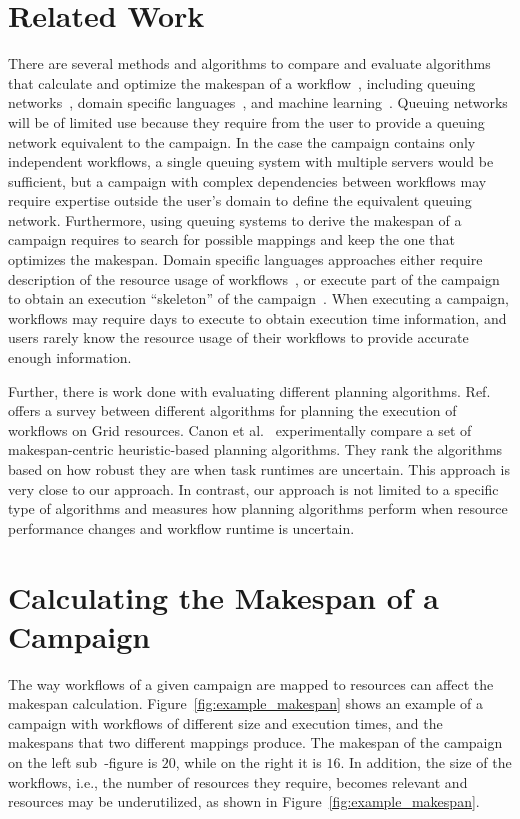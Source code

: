 \section{Related Work}
There are several methods and algorithms to compare and evaluate algorithms 
that calculate and optimize the makespan of a workflow~\cite{lu2019review}, 
including queuing networks~\cite{yao2019throughput,bao2019performance}, domain 
specific languages~\cite{carothers2017durango,maheshwari2016workflow}, and 
machine learning~\cite{witt2019predictive,pumma2017runtime}. Queuing networks 
will be of limited use because they require from the user to provide a queuing 
network equivalent to the campaign. In the case the campaign contains only 
independent workflows, a single queuing system with multiple servers would be 
sufficient, but a campaign with complex dependencies between workflows may 
require expertise outside the user's domain to define the equivalent queuing 
network. Furthermore, using queuing systems to derive the makespan of a 
campaign requires to search for possible mappings and keep the one that 
optimizes the makespan. Domain specific languages approaches either require 
description of the resource usage of workflows~\cite{carothers2017durango}, or 
execute part of the campaign to obtain an execution ``skeleton'' of the 
campaign~\cite{maheshwari2016workflow}. When executing a campaign, workflows 
may require days to execute to obtain execution time information, and users 
rarely know the resource usage of their workflows to provide accurate enough 
information.

Further, there is work done with evaluating different planning algorithms. 
Ref.~\cite{wieczorek2005scheduling} offers a survey between different 
algorithms for planning the execution of workflows on Grid resources.
Canon et al.~\cite{canon2008comparative} experimentally compare a set of 
makespan-centric heuristic-based planning algorithms. They rank the algorithms 
based on how robust they are when task runtimes are uncertain. This approach 
is very close to our approach. In contrast, our approach is not limited to a 
specific type of algorithms and measures how planning algorithms perform when 
resource performance changes and workflow runtime is uncertain.

\section{Calculating the Makespan of a Campaign}
\label{sec:makespan_calc}
The way workflows of a given campaign are mapped to resources can affect the 
makespan calculation. Figure~\ref{fig:example_makespan} shows an example of a 
campaign with workflows of different size and execution times, and the 
makespans that two different mappings produce. The makespan of the campaign on 
the left sub~-figure is $20$, while on the right it is $16$. In addition, the 
size of the workflows, i.e., the number of resources they require, becomes 
relevant and resources may be underutilized, as shown in 
Figure~\ref{fig:example_makespan}.


